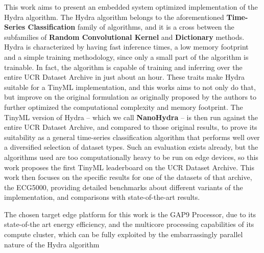 This work aims to present an embedded system optimized implementation of the Hydra algorithm. 
The Hydra algorithm belongs to the aforementioned \textbf{Time-Series Classification} family of algorithms, and it is a cross between the subfamilies of \textbf{Random Convolutional Kernel} and \textbf{Dictionary} methods. 
Hydra is characterized by having fast inference times, a low memory footprint and a simple training methodology, since only a small part of the algorithm is trainable. In fact, the algorithm is capable of training and inferring over
the entire UCR Dataset Archive in just about an hour. These traits make Hydra suitable for a TinyML implementation, and this works aims to not only do that, but improve on the original formulation as originally proposed by the authors
to further optimized the computational complexity and memory footprint. The TinyML version of Hydra -- which we call \textbf{NanoHydra} -- is then run against the entire UCR Dataset Archive, and compared to those original results, to prove its suitability as a general 
time-series classification algorithm that performs well over a diversified selection of dataset types. Such an evaluation exists already, but the algorithms used are too computationally heavy to be run on edge devices, so this work proposes the first TinyML
leaderboard on the UCR Dataset Archive. This work then focuses on the specific results for one of the datasets of that archive, the ECG5000, providing detailed benchmarks about different variants of the implementation, and comparisons with state-of-the-art results.

The chosen target edge platform for this work is the GAP9 Processor, due to its state-of-the art energy efficiency, and the multicore processing capabilities of its compute cluster, which can be fully exploited by the embarrassingly parallel nature of the Hydra algorithm